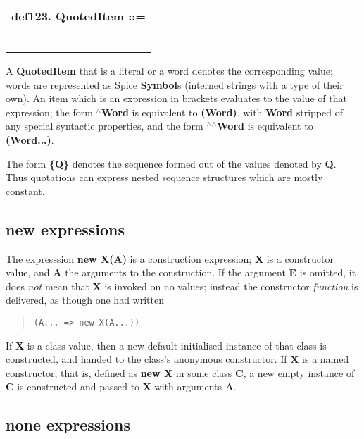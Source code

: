 \documentclass{report}
\begin{document}
\begin{tabular}{l}
{\bf def123. QuotedItem ::= }\\ 
\hspace*{3mm}{\tt Word} \\ 
\hspace*{3mm}{\tt  $\mid$ "\{" QuotedItems "\}"} \\ 
\hspace*{3mm}{\tt  $\mid$ "(" Expr ")"} \\ 
\hspace*{3mm}{\tt  $\mid$ "$^\wedge$" Word} \\ 
\hspace*{3mm}{\tt  $\mid$ "$^\wedge$$^\wedge$" Word} \\ 
\hspace*{3mm}{\tt  $\mid$ Literal} \\ 
\end{tabular}

A {\bf QuotedItem} that is a literal or a word denotes the corresponding value;
words are represented as Spice {\bf Symbol}s (interned strings with a type of
their own). An item which is an expression in brackets evaluates to the
value of that expression; the form {\bf $^\wedge$Word} is equivalent to {\bf (Word)},
with {\bf Word} stripped of any special syntactic properties, and the form
{\bf $^\wedge$$^\wedge$Word} is equivalent to {\bf (Word...)}.

The form {\bf \{Q\}} denotes the sequence formed out of the values denoted by {\bf Q}.
Thus quotations can express nested sequence structures which are mostly
constant.\subsection{new expressions}


The expresssion {\bf new X(A)} is a construction expression; {\bf X} is a constructor
value, and {\bf A} the arguments to the construction. If the argument {\bf E} is
omitted, it does {\em not} mean that {\bf X} is invoked on no values; instead
the constructor {\em function} is delivered, as though one had written

\begin{quote}
\begin{verbatim}
(A... => new X(A...))
\end{verbatim}
\end{quote}
If {\bf X} is a class value, then a new default-initialised instance of that class
is constructed, and handed to the class's anonymous constructor. If {\bf X} is a
named constructor, that is, defined as {\bf new X} in some class {\bf C}, a new empty
instance of {\bf C} is constructed and passed to {\bf X} with arguments {\bf A}.\subsection{none expressions}
\end{document}

